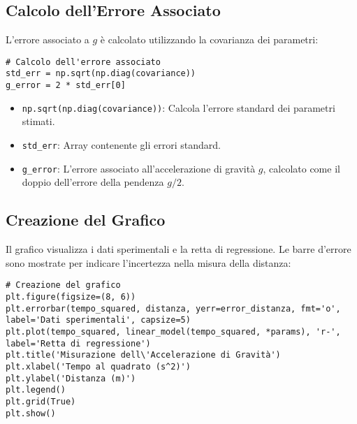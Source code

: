 \subsection{Calcolo dell'Errore Associato}
L'errore associato a \( g \) è calcolato utilizzando la covarianza dei parametri:

\begin{lstlisting}
# Calcolo dell'errore associato
std_err = np.sqrt(np.diag(covariance))
g_error = 2 * std_err[0]

\end{lstlisting}

\begin{itemize}
    \item \texttt{np.sqrt(np.diag(covariance))}: Calcola l'errore standard dei parametri stimati.
    \item \texttt{std\_err}: Array contenente gli errori standard.
    \item \texttt{g\_error}: L'errore associato all'accelerazione di gravità \( g \), calcolato come il doppio dell'errore della pendenza \( g/2 \).
\end{itemize}

\subsection{Creazione del Grafico}
Il grafico visualizza i dati sperimentali e la retta di regressione. Le barre d'errore sono mostrate per indicare l'incertezza nella misura della distanza:

\begin{lstlisting}
# Creazione del grafico
plt.figure(figsize=(8, 6))
plt.errorbar(tempo_squared, distanza, yerr=error_distanza, fmt='o', label='Dati sperimentali', capsize=5)
plt.plot(tempo_squared, linear_model(tempo_squared, *params), 'r-', label='Retta di regressione')
plt.title('Misurazione dell\'Accelerazione di Gravità')
plt.xlabel('Tempo al quadrato (s^2)')
plt.ylabel('Distanza (m)')
plt.legend()
plt.grid(True)
plt.show()
\end{lstlisting}

